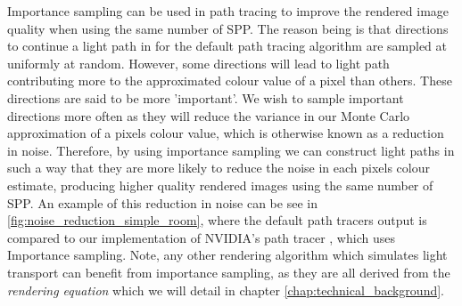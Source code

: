 \documentclass[../dissertation.tex]{subfiles}
\begin{document}
Importance sampling can be used in path tracing to improve the rendered image quality when using the same number of SPP. The reason being is that directions to continue a light path in for the default path tracing algorithm are sampled at uniformly at random. However, some directions will lead to light path contributing more to the approximated colour value of a pixel than others. These directions are said to be more 'important'. We wish to sample important directions more often as they will reduce the variance in our Monte Carlo approximation of a pixels colour value, which is otherwise known as a reduction in noise. Therefore, by using importance sampling we can construct light paths in such a way that they are more likely to reduce the noise in each pixels colour estimate, producing higher quality rendered images using the same number of SPP. An example of this reduction in noise can be see in \ref{fig:noise_reduction_simple_room}, where the default path tracers output is compared to our implementation of NVIDIA's path tracer \cite{dahm2017learning}, which uses Importance sampling. Note, any other rendering algorithm which simulates light transport can benefit from importance sampling, as they are all derived from the \textit{rendering equation} \cite{jensen1996global, keller2016path} which we will detail in chapter \ref{chap:technical_background}.
\end{document}
